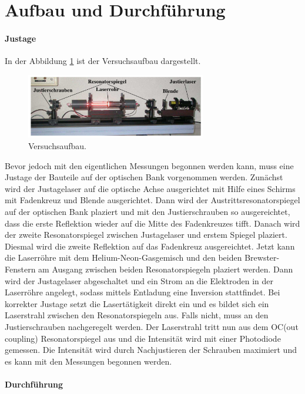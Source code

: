 \newpage
\section{Aufbau und Durchführung}
\label{sec:Durchführung}
\paragraph{Justage}
In der Abbildung \ref{fig:aufbau} ist
der Versuchsaufbau dargestellt.
\begin{figure}
  \centering
  \includegraphics[width=0.7\textwidth]{figures/Aufbau.PNG}
  \caption{Versuchsaufbau.}
  \label{fig:aufbau}
\end{figure}
Bevor jedoch mit den eigentlichen Messungen
begonnen werden
kann, muss eine Justage der Bauteile auf der optischen Bank vorgenommen werden.
Zunächst wird der Justagelaser auf die optische Achse
ausgerichtet
mit Hilfe eines Schirms mit Fadenkreuz und Blende
ausgerichtet.
Dann wird der Austrittsresonatorspiegel
auf der optischen Bank plaziert
und mit den Justierschrauben so ausgereichtet,
dass die erste Reflektion wieder auf die
Mitte des Fadenkreuzes tifft.
Danach wird der
zweite Resonatorspiegel zwischen Justagelaser
und erstem Spiegel plaziert.
Diesmal wird die zweite Reflektion
auf das Fadenkreuz ausgereichtet.
Jetzt kann die Laserröhre mit dem Helium-Neon-Gasgemisch und
den beiden Brewster-Fenstern am Ausgang
zwischen beiden Resonatorspiegeln
plaziert werden.
Dann wird der Justagelaser abgeschaltet
und ein Strom an die
Elektroden in der Laserröhre
angelegt, sodass mittels Entladung eine Inversion
stattfindet. Bei korrekter
Justage setzt die Lasertätigkeit direkt ein
und es bildet sich ein Laserstrahl
zwischen den Resonatorspiegeln aus.
Falls nicht, muss an den Justierschrauben
nachgeregelt werden.
Der Laserstrahl tritt nun aus dem OC(out coupling) Resonatorspiegel
aus und die Intensität wird mit einer Photodiode gemessen.
Die Intensität wird durch Nachjustieren der Schrauben maximiert und
es kann mit den Messungen begonnen werden.



\paragraph{Durchführung}
